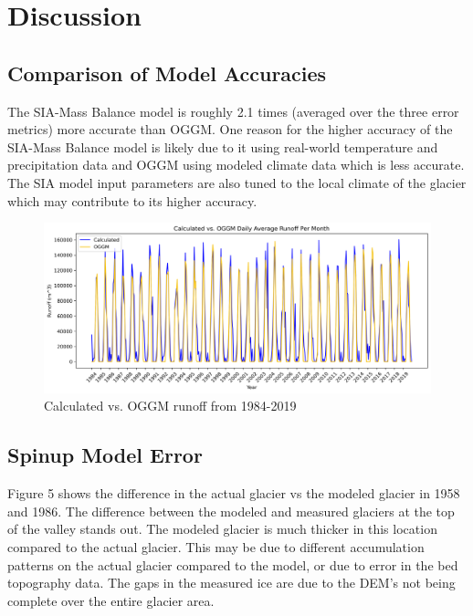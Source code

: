 \documentclass{article}
\begin{document}
\section{Discussion}
\subsection{Comparison of Model Accuracies}
The SIA-Mass Balance model is roughly 2.1 times (averaged over the three error metrics) more accurate than OGGM. One reason for the 
higher accuracy of the SIA-Mass Balance model is likely due to it 
using real-world temperature and precipitation data and OGGM using modeled climate data which is less accurate. The SIA model input 
parameters are also tuned to the local climate of the glacier which may contribute to its higher accuracy.

\begin{figure}[h!]
    \centering
    \includegraphics[width=\textwidth]{Plots/oggm_vs_calculated.png}
    \caption{Calculated vs. OGGM runoff from 1984-2019}
    \label{fig:oggm_model_run_1984_2019}
\end{figure}
\FloatBarrier

\subsection{Spinup Model Error}
Figure 5 shows the difference in the actual glacier vs the modeled glacier in 1958 and 1986. The difference between the modeled and measured glaciers at the top of the valley stands out. The modeled glacier is much thicker in this 
location compared to the actual glacier. This may be due to different accumulation patterns on the actual glacier compared to the model, or due to error in the bed 
topography data. The gaps in the measured ice are due to the DEM's not being complete over the entire glacier area. 
\end{document}

